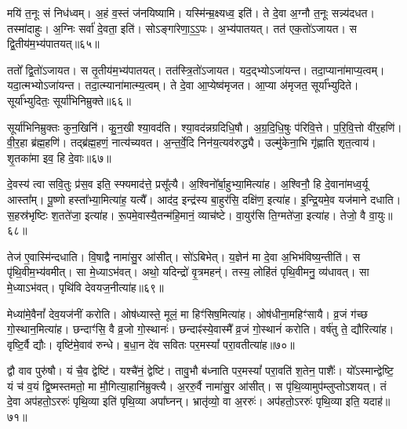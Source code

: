 मयि॑ त॒नूः सं निध॑ध्वम्।
अ॒हं व॒स्तं ज॑नयिष्यामि।
यस्मि॑न्म्र॒क्ष्यध्व॒ इति॑।
ते दे॒वा अ॒ग्नौ त॒नूः सन्न्य॑दधत।
तस्मा॑दाहुः।
अ॒ग्निः सर्वा॑ दे॒वता॒ इति॑।
सोऽङ्गा॑रेणा॒ऽ॒ऽ॒पः।
अ॒भ्य॑पातयत्।
तत॑ एक॒तो॑\-ऽजायत।
स द्वि॒तीय॑म॒भ्य॑\-पातयत्॥६५॥\ip

ततो᳚ द्वि॒तो॑\-ऽजायत।
स तृ॒तीय॑म॒भ्य॑पातयत्।
तत॑स्त्रि॒तो॑\-ऽजायत।
यद॒द्भ्यो\-ऽजा॑यन्त।
तदा॒प्याना॑माप्य॒त्वम्।
यदा॒त्मभ्यो\-ऽजा॑यन्त।
तदा॒त्म्याना॑मात्म्य॒त्वम्।
ते दे॒वा आ॒प्येष्व॑मृजत।
आ॒प्या अ॑मृजत॒ सूर्या᳚भ्युदिते।
सूर्या᳚भ्युदितः॒ सूर्या॑भिनिम्रुक्ते॥६६॥\ip

सूर्या॑भिनिम्रुक्तः कुन॒खिनि॑।
कु॒न॒खी श्या॒वद॑ति।
श्या॒वद॑न्नग्र\-दिधि॒षौ।
अ॒ग्र॒दि॒धि॒षुः प॑रिवि॒त्ते।
प॒रि॒वि॒त्तो वी॑र॒हणि॑।
वी॒र॒हा ब्र॑ह्म॒हणि॑।
तद्ब्र॑ह्म॒हणं॒ नात्य॑च्यवत।
अ॒न्त॒र्वे॒दि निन॑य॒त्यव॑रुद्ध्यै।
उल्मु॑केना॒भि गृ॑ह्णाति शृत॒त्वाय॑।
शृ॒तका॑मा इव॒ हि दे॒वाः॥६७॥\ip\anuvakamend[अ॒न्या जि॑न्वन्त्यनु वि॒सृत्यै॒वमा॒हाशा᳚न्त आह॒ गुप्त्यै॑ छ॒न्नं ब्रह्मा᳚ब्रवीद्द्वि॒तीय॑म॒भ्य॑पातय॒थ्सूर्या॑भिनिम्रुक्ते दे॒वाः]

दे॒वस्य॑ त्वा सवि॒तुः प्र॑स॒व इति॒ स्फ्यमाद॑त्ते॒ प्रसू᳚त्यै।
अ॒श्विनो᳚र्बा॒हुभ्या॒मित्या॑ह।
अ॒श्विनौ॒ हि दे॒वाना॑मध्व॒र्यू आस्ता᳚म्।
पू॒ष्णो हस्ता᳚भ्या॒मित्या॑ह॒ यत्यै᳚।
आद॑द॒ इन्द्र॑स्य बा॒हुर॑सि॒ दक्षि॑ण॒ इत्या॑ह।
इ॒न्द्रि॒यमे॒व यज॑माने दधाति।
स॒हस्र॑भृष्टिः श॒तते॑जा॒ इत्या॑ह।
रू॒पमे॒वास्यै॒तन्म॑हि॒मानं॒ व्याच॑ष्टे।
वा॒युर॑सि ति॒ग्मते॑जा॒ इत्या॑ह।
तेजो॒ वै वा॒युः॥६८॥\ip

तेज॑ ए॒वास्मि॑न्दधाति।
वि॒षाद्वै नामा॑सु॒र आ॑सीत्।
सो॑ऽबिभेत्।
य॒ज्ञेन॑ मा दे॒वा अ॒भिभ॑विष्य॒न्तीति॑।
स पृ॑थि॒वीम॒भ्य॑वमीत्।
सा मे॒ध्या\-ऽभ॑वत्।
अथो॒ यदिन्द्रो॑ वृ॒त्रमहन्॑।
तस्य॒ लोहि॑तं पृथि॒वीमनु॒ व्य॑धावत्।
सा मे॒ध्या\-ऽभ॑वत्।
पृथि॑वि देवयज॒नीत्या॑ह॥६९॥\ip

मेध्या॑मे॒वैनां᳚ देव॒यज॑नीं करोति।
ओष॑ध्यास्ते॒ मूलं॒ मा हिꣳ॑सिष॒मित्या॑ह।
ओष॑धीना॒महिꣳ॑सायै।
व्र॒जं ग॑च्छ गो॒स्थान॒मित्या॑ह।
छन्दाꣳ॑सि॒ वै व्र॒जो गो॒स्थानः॑।
छन्दाꣴ॑स्ये॒वास्मै᳚ व्र॒जं गो॒स्थानं॑ करोति।
वर्\mbox{}ष॑तु ते॒ द्यौरित्या॑ह।
वृष्टि॒र्वै द्यौः।
वृष्टि॑मे॒वाव॑ रुन्धे।
ब॒धा॒न दे॑व सवितः पर॒मस्यां᳚ परा॒वतीत्या॑ह॥७०॥\ip

द्वौ वाव पुरु॑षौ।
यं चै॒व द्वेष्टि॑।
यश्चै॑नं॒ द्वेष्टि॑।
तावु॒भौ ब॑ध्नाति पर॒मस्यां᳚ परा॒वति॑ श॒तेन॒ पाशैः᳚।
यो᳚ऽस्मान्द्वेष्टि॒ यं च॑ व॒यं द्वि॒ष्मस्तमतो॒ मा मौ॒गित्या॒हानि॑म्रुक्त्यै।
अ॒ररु॒र्वै नामा॑सु॒र आ॑सीत्।
स पृ॑थि॒व्यामुप॑म्लुप्तो\-ऽशयत्।
तं दे॒वा अप॑हतो॒\-ऽररुः॑ पृथि॒व्या इति॑ पृथि॒व्या अपा᳚घ्नन्।
भ्रातृ॑व्यो॒ वा अ॒ररुः॑।
अप॑हतो॒\-ऽररुः॑ पृथि॒व्या इति॒ यदाह॑॥७१॥\ip

